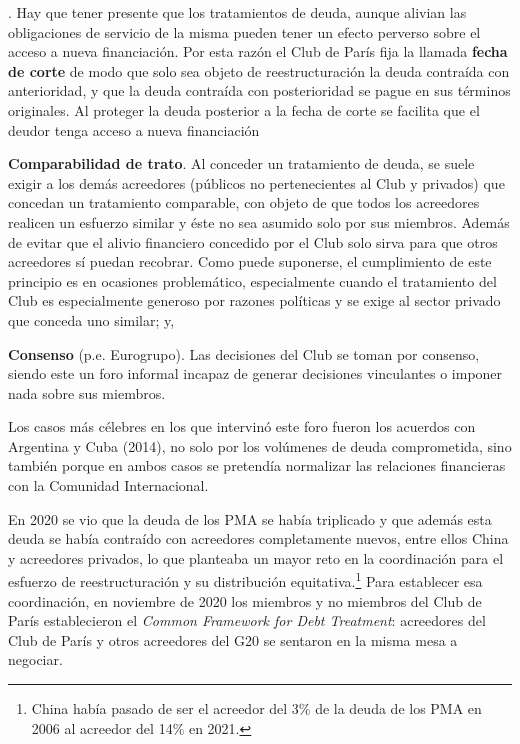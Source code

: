 \documentclass[10pt,a4paper]{article}
\newcounter{numitem}
\newenvironment{lnum}
      {\begin{list}{\arabic{numitem}.}{%
          \usecounter{numitem}%
          \setlength{\leftmargin}{1cm}%
          \setlength{\parskip}{3pt}%
          \setlength{\itemsep}{0pt}%
          \setlength{\parsep}{0pt}%
      }}
      {\end{list}}
\begin{document}
\begin{lnum}
{    Hay que tener presente que los tratamientos de deuda, aunque alivian las obligaciones de servicio de la misma pueden tener un efecto perverso sobre el acceso a nueva financiación. Por esta razón el Club de París fija la llamada \textbf{fecha de corte} de modo que solo sea objeto de reestructuración la deuda contraída con anterioridad, y que la deuda contraída con posterioridad se pague en sus términos originales. Al proteger la deuda posterior a la fecha de corte se facilita que el deudor tenga acceso a nueva financiación
    }
    \item \textbf{Comparabilidad de trato}. Al conceder un tratamiento de deuda, se suele exigir a los demás acreedores (públicos no pertenecientes al Club y privados) que concedan un tratamiento comparable, con objeto de que todos los acreedores realicen un esfuerzo similar y éste no sea asumido solo por sus miembros. Además de evitar que el alivio financiero concedido por el Club solo sirva para que otros acreedores sí puedan recobrar. Como puede suponerse, el cumplimiento de este principio es en ocasiones problemático, especialmente cuando el tratamiento del Club es especialmente generoso por razones políticas y se exige al sector privado que conceda uno similar; y,
    \item \textbf{Consenso} (p.e. Eurogrupo). Las decisiones del Club se toman por consenso, siendo este un foro informal incapaz de generar decisiones vinculantes o imponer nada sobre sus miembros.
\end{lnum}

Los casos más célebres en los que intervinó este foro fueron los acuerdos con Argentina y Cuba (2014), no solo por los volúmenes de deuda comprometida, sino también porque en ambos casos se pretendía normalizar las relaciones financieras con la Comunidad Internacional.

En 2020 se vio que la deuda de los PMA se había triplicado y que además esta deuda se había contraído con acreedores completamente nuevos, entre ellos China y acreedores privados, lo que planteaba un mayor reto en la coordinación para el esfuerzo de reestructuración y su distribución equitativa.\footnote{%
    China había pasado de ser el acreedor del 3\% de la deuda de los PMA en 2006 al acreedor del 14\% en 2021.
} Para establecer esa coordinación, en noviembre de 2020 los miembros y no miembros del Club de París establecieron el \textit{Common Framework for Debt Treatment}: acreedores del Club de París y otros acreedores del G20 se sentaron en la misma mesa a negociar. 
\end{document}
